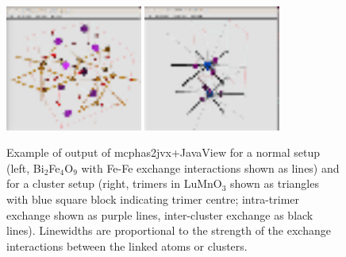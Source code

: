 \begin{description}
\begin{figure}[htb]%
\begin{center}\leavevmode
\includegraphics[angle=0, width=0.4\textwidth]{figsrc/mcphas_jvx.eps}
\includegraphics[angle=0, width=0.4\textwidth]{figsrc/trimer_jvx.eps}
\end{center}
\caption{Example of output of mcphas2jvx+JavaView for a normal setup (left, Bi$_2$Fe$_4$O$_9$ with Fe-Fe exchange interactions shown as
lines) and for a cluster setup (right, trimers in LuMnO$_3$ shown as triangles with blue square block indicating trimer centre; intra-trimer
exchange shown as purple lines, inter-cluster exchange as black lines). Linewidths are proportional to the strength of the exchange 
interactions between the linked atoms or clusters.}
\label{mcphas2jvx}
\end{figure}


\end{description}
